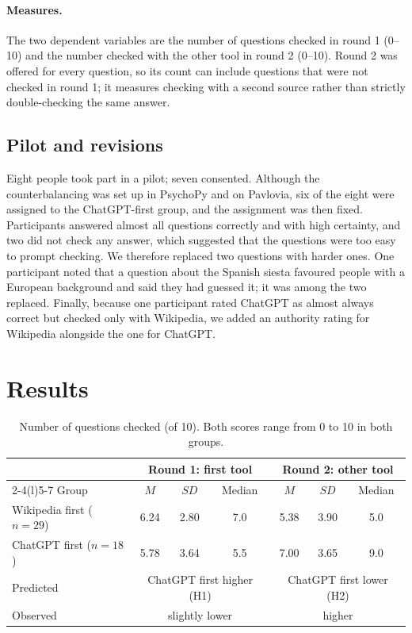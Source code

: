 \documentclass[11pt,a4paper]{article}
\begin{document}
\paragraph{Measures.} The two dependent variables are the number of questions checked in round 1 (0--10) and the number checked with the other tool in round 2 (0--10). Round 2 was offered for every question, so its count can include questions that were not checked in round 1; it measures checking with a second source rather than strictly double-checking the same answer.

\subsection{Pilot and revisions}\label{sec:pilot}
Eight people took part in a pilot; seven consented. Although the counterbalancing was set up in PsychoPy and on Pavlovia, six of the eight were assigned to the ChatGPT-first group, and the assignment was then fixed. Participants answered almost all questions correctly and with high certainty, and two did not check any answer, which suggested that the questions were too easy to prompt checking. We therefore replaced two questions with harder ones. One participant noted that a question about the Spanish siesta favoured people with a European background and said they had guessed it; it was among the two replaced. Finally, because one participant rated ChatGPT as almost always correct but checked only with Wikipedia, we added an authority rating for Wikipedia alongside the one for ChatGPT.

\section{Results}
\begin{table}[h]
\centering\small
\begin{tabular}{@{}lcccccc@{}}
\toprule
& \multicolumn{3}{c}{Round 1: first tool} & \multicolumn{3}{c}{Round 2: other tool} \\
\cmidrule(lr){2-4}\cmidrule(l){5-7}
Group & $M$ & $SD$ & Median & $M$ & $SD$ & Median \\
\midrule
Wikipedia first ($n = 29$) & 6.24 & 2.80 & 7.0 & 5.38 & 3.90 & 5.0 \\
ChatGPT first ($n = 18$) & 5.78 & 3.64 & 5.5 & 7.00 & 3.65 & 9.0 \\
\midrule
Predicted & \multicolumn{3}{c}{ChatGPT first higher (H1)} & \multicolumn{3}{c}{ChatGPT first lower (H2)} \\
Observed & \multicolumn{3}{c}{slightly lower} & \multicolumn{3}{c}{higher} \\
\bottomrule
\end{tabular}
\caption{Number of questions checked (of 10). Both scores range from 0 to 10 in both groups.}
\label{tab:desc}
\end{table}
\end{document}
